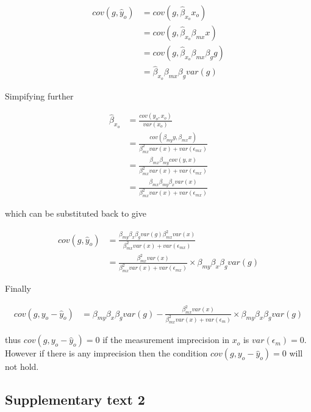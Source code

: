\documentclass[]{article}
\begin{document}
\[
\begin{aligned}
cov(g, \hat{y}_o) & = cov(g, \hat{\beta}_{x_o} x_o) \\
                  & = cov(g, \hat{\beta}_{x_o} \beta_{mx} x) \\
                  & = cov(g, \hat{\beta}_{x_o} \beta_{mx} \beta_g g) \\
                  & = \hat{\beta}_{x_o} \beta_{mx} \beta_g var(g)
\end{aligned}
\]

Simpifying further

\[
\begin{aligned}
\hat{\beta}_{x_o} & = \frac{cov(y_o, x_o)} {var(x_o)} \\
                  & = \frac{cov(\beta_{my} y, \beta_{mx} x)} {\beta_{mx}^2 var(x) + var(\epsilon_{mx})} \\
                  & = \frac{\beta_{mx} \beta_{my} cov(y, x)} {\beta_{mx}^2 var(x) + var(\epsilon_{mx})} \\
                  & = \frac{\beta_{mx} \beta_{my} \beta_x var(x)} {\beta_{mx}^2 var(x) + var(\epsilon_{mx})}
\end{aligned}
\]

which can be substituted back to give

\[
\begin{aligned}
cov(g, \hat{y}_o) & = \frac{\beta_{my} \beta_x \beta_g var(g) \beta_{mx}^2 var(x)} {\beta_{mx}^2 var(x) + var(\epsilon_{mx})} \\
                  & = \frac{\beta_{mx}^2 var(x)} {\beta_{mx}^2 var(x) + var(\epsilon_{mx})} \times \beta_{my} \beta_x \beta_g var(g)
\end{aligned}
\]

Finally

\[
\begin{aligned}
cov(g, y_o - \hat{y}_o) & = \beta_{my} \beta_x \beta_g var(g) - \frac{\beta_{mx}^2 var(x)} {\beta_{mx}^2 var(x) + var(\epsilon_m)} \times \beta_{my} \beta_x \beta_g var(g)
\end{aligned}
\]

thus \(cov(g, y_o - \hat{y}_o) = 0\) if the measurement imprecision in
\(x_o\) is \(var(\epsilon_m) = 0\). However if there is any imprecision
then the condition \(cov(g, y_o - \hat{y}_o) = 0\) will not hold.

\newpage

\subsection{Supplementary text 2}\label{supplementary-text-2}
\end{document}
